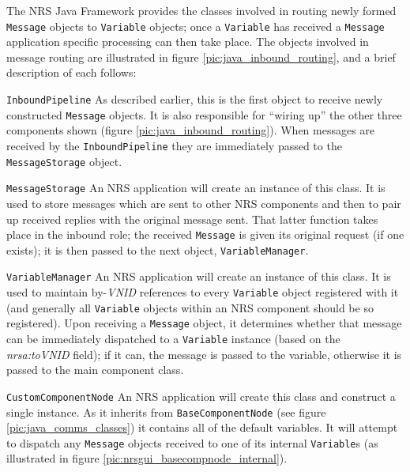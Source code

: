 \documentclass[pdftex,a4paper]{article}
\newcommand{\code}[1]{{\tt \small #1}}
\begin{document}
The NRS Java Framework provides the classes involved in routing newly
formed \code{Message} objects to \code{Variable} objects; once a
\code{Variable} has received a \code{Message} application specific
processing can then take place. The objects involved in message routing
are illustrated in figure \ref{pic:java_inbound_routing}, and a brief
description of each follows:

\begin{description}

\item{\code{InboundPipeline}} As described earlier, this is the first
  object to receive newly constructed \code{Message} objects. It is also
  responsible for ``wiring up'' the other three components shown (figure
  \ref{pic:java_inbound_routing}). When messages are received by the
  \code{InboundPipeline} they are immediately passed to the
  \code{MessageStorage} object.

\item{\code{MessageStorage}} An NRS application will create an instance
  of this class. It is used to store messages which are sent to other
  NRS components and then to pair up received replies with the original
  message sent. That latter function takes place in the inbound role;
  the received \code{Message} is given its original request (if one
  exists); it is then passed to the next object, \code{VariableManager}.

\item{\code{VariableManager}} An NRS application will create an instance
  of this class. It is used to maintain by-\emph{VNID} references to
  every \code{Variable} object registered with it (and generally all
  \code{Variable} objects within an NRS component should be so
  registered). Upon receiving a \code{Message} object, it determines
  whether that message can be immediately dispatched to a
  \code{Variable} instance (based on the \emph{nrsa:toVNID} field); if it
  can, the message is passed to the variable, otherwise it is passed to
  the main component class.

\item{\code{CustomComponentNode}} An NRS application will create this
  class and construct a single instance. As it inherits from
  \code{BaseComponentNode} (see figure \ref{pic:java_comms_classes}) it
  contains all of the default variables. It will attempt to dispatch any
  \code{Message} objects received to one of its internal
  \code{Variable}s (as illustrated in figure
  \ref{pic:nrsgui_basecompnode_internal}).

\end{description}
\end{document}
